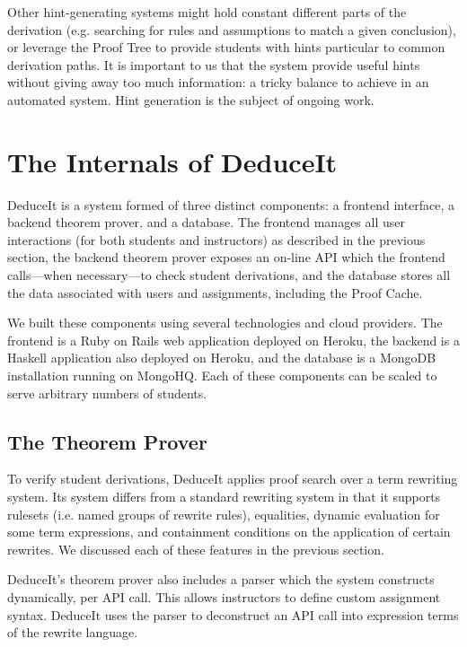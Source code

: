 \documentclass{sigchi}
\begin{document}
Other hint-generating systems might hold constant different parts of the derivation (e.g. searching for rules and assumptions to match a given conclusion), or leverage the Proof Tree to provide students with hints particular to common derivation paths. It is important to us that the system provide useful hints without giving away too much information: a tricky balance to achieve in an automated system. Hint generation is the subject of ongoing work.

\section{The Internals of DeduceIt}


DeduceIt is a system formed of three distinct components: a frontend interface, a backend theorem prover, and a database. The frontend manages all user interactions (for both students and instructors) as described in the previous section, the backend theorem prover exposes an on-line API which the frontend calls---when necessary---to check student derivations, and the database stores all the data associated with users and assignments, including the Proof Cache.

We built these components using several technologies and cloud providers. The frontend is a Ruby on Rails web application deployed on Heroku, the backend is a Haskell application also deployed on Heroku, and the database is a MongoDB installation running on MongoHQ. Each of these components can be scaled to serve arbitrary numbers of students.

\subsection{The Theorem Prover}

To verify student derivations, DeduceIt applies proof search over a term rewriting system. Its system differs from a standard rewriting system in that it supports rulesets (i.e. named groups of rewrite rules), equalities, dynamic evaluation for some term expressions, and containment conditions on the application of certain rewrites. We discussed each of these features in the previous section. 

DeduceIt's theorem prover also includes a parser which the system constructs dynamically, per API call. This allows instructors to define custom assignment syntax. DeduceIt uses the parser to deconstruct an API call into expression terms of the rewrite language. 
\end{document}
